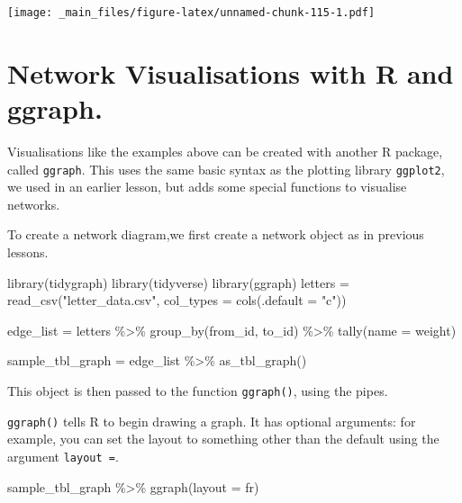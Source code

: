 \documentclass[
]{book}
\newenvironment{Shaded}{\begin{snugshade}}{\end{snugshade}}
\newcommand{\AttributeTok}[1]{\textcolor[rgb]{0.77,0.63,0.00}{#1}}
\newcommand{\FunctionTok}[1]{\textcolor[rgb]{0.00,0.00,0.00}{#1}}
\newcommand{\NormalTok}[1]{#1}
\newcommand{\OtherTok}[1]{\textcolor[rgb]{0.56,0.35,0.01}{#1}}
\newcommand{\SpecialCharTok}[1]{\textcolor[rgb]{0.00,0.00,0.00}{#1}}
\newcommand{\StringTok}[1]{\textcolor[rgb]{0.31,0.60,0.02}{#1}}
\begin{document}
\texttt{[image: \_main\_files/figure-latex/unnamed-chunk-115-1.pdf]}

\hypertarget{network-visualisations-with-r-and-ggraph.}{%
\section{Network Visualisations with R and ggraph.}\label{network-visualisations-with-r-and-ggraph.}}

Visualisations like the examples above can be created with another R package, called \texttt{ggraph}. This uses the same basic syntax as the plotting library \texttt{ggplot2}, we used in an earlier lesson, but adds some special functions to visualise networks.

To create a network diagram,we first create a network object as in previous lessons.

\begin{Shaded}
\begin{Highlighting}[]
\FunctionTok{library}\NormalTok{(tidygraph)}
\FunctionTok{library}\NormalTok{(tidyverse)}
\FunctionTok{library}\NormalTok{(ggraph)}
\NormalTok{letters }\OtherTok{=} \FunctionTok{read\_csv}\NormalTok{(}\StringTok{"letter\_data.csv"}\NormalTok{, }\AttributeTok{col\_types =} \FunctionTok{cols}\NormalTok{(}\AttributeTok{.default =} \StringTok{"c"}\NormalTok{))}

\NormalTok{edge\_list }\OtherTok{=}\NormalTok{ letters }\SpecialCharTok{\%\textgreater{}\%} 
  \FunctionTok{group\_by}\NormalTok{(from\_id, to\_id) }\SpecialCharTok{\%\textgreater{}\%} 
  \FunctionTok{tally}\NormalTok{(}\AttributeTok{name =} \StringTok{\textquotesingle{}weight\textquotesingle{}}\NormalTok{)}

\NormalTok{sample\_tbl\_graph }\OtherTok{=}\NormalTok{ edge\_list }\SpecialCharTok{\%\textgreater{}\%} 
  \FunctionTok{as\_tbl\_graph}\NormalTok{()}
\end{Highlighting}
\end{Shaded}

This object is then passed to the function \texttt{ggraph()}, using the pipes.

\texttt{ggraph()} tells R to begin drawing a graph. It has optional arguments: for example, you can set the layout to something other than the default using the argument \texttt{layout\ =}.

\begin{Shaded}
\begin{Highlighting}[]
\NormalTok{sample\_tbl\_graph }\SpecialCharTok{\%\textgreater{}\%} \FunctionTok{ggraph}\NormalTok{(}\AttributeTok{layout =} \StringTok{\textquotesingle{}fr\textquotesingle{}}\NormalTok{)}
\end{Highlighting}
\end{Shaded}
\end{document}
